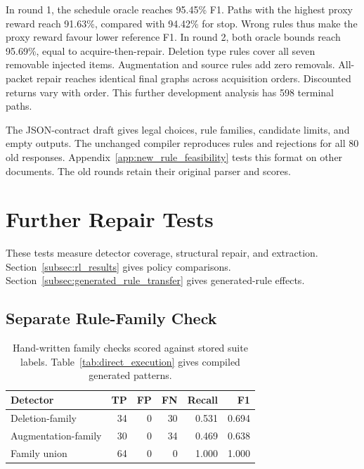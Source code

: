 In round 1, the schedule oracle reaches 95.45\% F1. Paths with the
highest proxy reward reach 91.63\%, compared with 94.42\% for stop.
Wrong rules thus make the proxy reward favour lower reference F1.
In round 2, both oracle bounds reach 95.69\%, equal to
acquire-then-repair. Deletion type rules cover all seven removable
injected items. Augmentation and source rules add zero removals.
All-packet repair reaches identical final graphs across acquisition
orders. Discounted returns vary with order. This further development
analysis has 598 terminal paths.

The JSON-contract draft gives legal choices, rule families, candidate
limits, and empty outputs. The unchanged compiler reproduces rules and
rejections for all 80 old responses. Appendix~\ref{app:new_rule_feasibility}
tests this format on other documents. The old rounds retain their
original parser and scores.

\section{Further Repair Tests}

\label{app:supporting_checks}

These tests measure detector coverage, structural repair, and extraction.
Section~\ref{subsec:rl_results} gives policy comparisons.
Section~\ref{subsec:generated_rule_transfer} gives generated-rule effects.

\subsection{Separate Rule-Family Check}

\label{subsubsec:rule_family_final_ablation}

\begin{table}[t]
\centering
\caption{Hand-written family checks scored against stored suite labels. Table~\ref{tab:direct_execution} gives compiled generated patterns.}
\label{tab:rule_family_final_ablation}
\footnotesize
\setlength{\tabcolsep}{3pt}
\begin{tabular*}{\columnwidth}{@{\extracolsep{\fill}}lrrrrr@{}}
\toprule
Detector & TP & FP & FN & Recall & F1 \\
\midrule
Deletion-family & 34 & 0 & 30 & 0.531 & 0.694 \\
Augmentation-family & 30 & 0 & 34 & 0.469 & 0.638 \\
Family union & 64 & 0 & 0 & 1.000 & 1.000 \\
\bottomrule
\end{tabular*}
\end{table}


